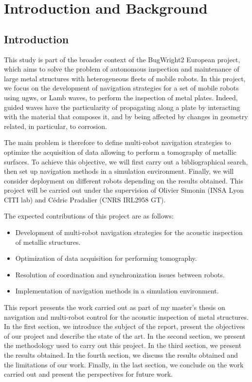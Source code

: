 
\chapter{Introduction and Background}

\section{Introduction}

This study is part of the broader context of the BugWright2 European project, which aims to solve the problem of autonomous inspection and maintenance of large metal structures with heterogeneous fleets of mobile robots.
In this project, we focus on the development of navigation strategies for a set of mobile robots using \gls{ugw}s, or Lamb waves, to perform the inspection of metal plates.
Indeed, guided waves have the particularity of propagating along a plate by interacting with the material that composes it, and by being affected by changes in geometry related, in particular, to corrosion.

The main problem is therefore to define multi-robot navigation strategies to optimize the acquisition of data allowing to perform a tomography of metallic surfaces.
To achieve this objective, we will first carry out a bibliographical search, then set up navigation methods in a simulation environment.
Finally, we will consider deployment on different robots depending on the results obtained.
This project will be carried out under the supervision of Olivier Simonin (INSA Lyon CITI lab) and Cédric Pradalier (CNRS IRL2958 GT).

The expected contributions of this project are as follows:
\begin{itemize}
	\item Development of multi-robot navigation strategies for the acoustic inspection of metallic structures.
	\item Optimization of data acquisition for performing tomography.
	\item Resolution of coordination and synchronization issues between robots.
	\item Implementation of navigation methods in a simulation environment.
\end{itemize}

This report presents the work carried out as part of my master's thesis on navigation and multi-robot control for the acoustic inspection of metal structures.
In the first section, we introduce the subject of the report, present the objectives of our project and describe the state of the art.
In the second section, we present the methodology used to carry out this project.
In the third section, we present the results obtained.
In the fourth section, we discuss the results obtained and the limitations of our work.
Finally, in the last section, we conclude on the work carried out and present the perspectives for future work.

